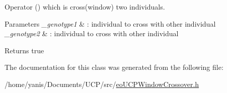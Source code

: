 \-Operator () which is cross(window) two individuals. 


\begin{DoxyParams}{\-Parameters}
{\em \-\_\-genotype1} & \-: individual to cross with other individual \\
\hline
{\em \-\_\-genotype2} & \-: individual to cross with other individual \\
\hline
\end{DoxyParams}
\begin{DoxyReturn}{\-Returns}
true 
\end{DoxyReturn}


\-The documentation for this class was generated from the following file\-:\begin{DoxyCompactItemize}
\item 
/home/yanis/\-Documents/\-U\-C\-P/src/\hyperlink{eo_u_c_p_window_crossover_8h}{eo\-U\-C\-P\-Window\-Crossover.\-h}\end{DoxyCompactItemize}
